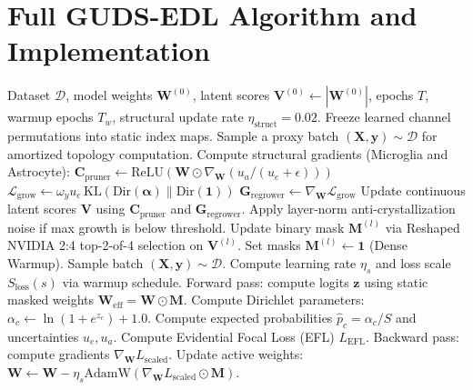 \documentclass[letterpaper]{article} %
\newcommand{\Dir}{\text{Dir}}
\newcommand{\KL}{\text{KL}}
\begin{document}
\section{Full GUDS-EDL Algorithm and Implementation}
\begin{algorithm}[t]
\caption{Universal GUDS-EDL Training and Optimization Loop}
\label{alg:guds_edl}
\begin{algorithmic}[1]
\REQUIRE Dataset $\mathcal{D}$, model weights $\bm{W}^{(0)}$, latent scores $\bm{V}^{(0)} \leftarrow |\bm{W}^{(0)}|$, epochs $T$, warmup epochs $T_w$, structural update rate $\eta_{\text{struct}} = 0.02$.
        \STATE Freeze learned channel permutations into static index maps.
    \ENDIF
        \STATE Sample a proxy batch $(\bm{X}, \bm{y}) \sim \mathcal{D}$ for amortized topology computation.
        \STATE Compute structural gradients (Microglia and Astrocyte):
        \STATE \quad $\bm{C}_{\text{pruner}} \leftarrow \text{ReLU}\left( \bm{W} \odot \nabla_{\bm{W}} (u_a / (u_e + \epsilon)) \right)$
        \STATE \quad $\mathcal{L}_{\text{grow}} \leftarrow \omega_y u_e\, \KL(\Dir(\bm{\alpha}) \parallel \Dir(\mathbf{1}))$
        \STATE \quad $\bm{G}_{\text{regrower}} \leftarrow \nabla_{\bm{W}} \mathcal{L}_{\text{grow}}$
        \STATE Update continuous latent scores $\bm{V}$ using $\bm{C}_{\text{pruner}}$ and $\bm{G}_{\text{regrower}}$.
        \STATE Apply layer-norm anti-crystallization noise if max growth is below threshold.
        \STATE Update binary mask $\bm{M}^{(l)}$ via Reshaped NVIDIA 2:4 top-2-of-4 selection on $\bm{V}^{(l)}$.
    \ELSE
        \STATE Set masks $\bm{M}^{(l)} \leftarrow \mathbf{1}$ (Dense Warmup).
    \ENDIF
        \STATE Sample batch $(\bm{X}, \bm{y}) \sim \mathcal{D}$.
        \STATE Compute learning rate $\eta_s$ and loss scale $S_{\text{loss}}(s)$ via warmup schedule.
        \STATE Forward pass: compute logits $\bm{z}$ using static masked weights $\bm{W}_{\text{eff}} = \bm{W} \odot \bm{M}$.
        \STATE Compute Dirichlet parameters: $\alpha_c \leftarrow \ln(1 + e^{z_c}) + 1.0$.
        \STATE Compute expected probabilities $\hat{p}_c = \alpha_c/S$ and uncertainties $u_e, u_a$.
        \STATE Compute Evidential Focal Loss (EFL) $L_{\text{EFL}}$.
        \STATE Backward pass: compute gradients $\nabla_{\bm{W}} L_{\text{scaled}}$.
        \STATE Update active weights: $\bm{W} \leftarrow \bm{W} - \eta_s \text{AdamW}(\nabla_{\bm{W}} L_{\text{scaled}} \odot \bm{M})$.
    \ENDFOR
\  \ENDFOR
\end{algorithmic}
\end{algorithm}
\end{document}
